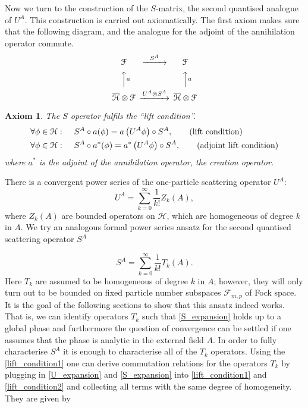 \documentclass[b5paper,draft,openbib,12pt]{memoir}
\newtheorem{axiom}{Axiom}
\begin{document}
Now we turn to the construction of the \(S\)-matrix, the second quantised analogue of \(U^A\). This construction is carried out axiomatically. The first axiom makes sure that the following diagram, and the analogue for the adjoint of the annihilation operator commute.
\begin{equation}
\begin{CD}								%
\mathcal{F}     @>S^A>>  \mathcal{F}\\
@AAaA        @AAaA\\
\overline{\mathcal{H}}\otimes \mathcal{F}     @>U^A\otimes S^A>>  \overline{\mathcal{H}}\otimes \mathcal{F} 
\end{CD}
\end{equation}
\begin{axiom}
The \(S\) operator fulfils the ``lift condition''.
\begin{align}\label{lift_condition1}
\forall \phi\in \mathcal{H}:& \hspace{0.5cm} S^A \circ a(\phi)=a\left( U^A \phi \right)  \circ S^A,\tag{lift condition}\\
\label{lift_condition2}
\forall \phi\in \mathcal{H}:& \hspace{0.5cm} S^A \circ a^*(\phi)=a^*\left( U^A \phi \right)  \circ S^A,\tag{adjoint lift condition}
\end{align}
where \(a^*\) is the adjoint of the annihilation operator, the creation operator. 
\end{axiom}

There is a convergent power series of the one-particle scattering operator \(U^A\):
\begin{equation}\label{U_expansion}
U^A = \sum_{k=0}^\infty \frac{1}{k!} Z_k(A),
\end{equation}
where \(Z_k(A)\) are bounded operators on \(\mathcal{H}\), which are homogeneous of degree \(k\) in \(A\).
We try an analogous formal power series ansatz for the second quantised scattering operator \(S^A\)

\begin{equation}\label{S_expansion}
S^A=\sum_{k=0}^\infty \frac{1}{k!} T_k(A).
\end{equation}
Here \(T_k\) are assumed to be homogeneous of degree \(k\) in \(A\); however, they will only turn out to be bounded on
fixed particle number subspaces \(\mathcal{F}_{m,p}\) of Fock space. It is the goal of the following  sections to
show that this ansatz indeed works. That is, we can identify operators \(T_k\) such that \eqref{S_expansion}
holds up to a global phase and furthermore the question of convergence can be settled if one assumes that 
the phase is analytic in the external field \(A\). %
In order to fully characterise \(S^A\) it is enough to characterise all of the \(T_k\) operators. 
Using the \eqref{lift_condition1} one can derive commutation relations for the operators 
\(T_k\) by plugging in \eqref{U_expansion} and \eqref{S_expansion} into \eqref{lift_condition1} and \eqref{lift_condition2}
and collecting all terms with the same degree of homogeneity. They are given by
\end{document}
